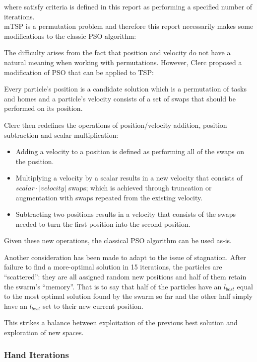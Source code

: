 \documentclass[a4paper]{article}
\begin{document}
where satisfy criteria is defined in this report as performing a specified number of iterations.\\

mTSP is a permutation problem and therefore this report necessarily makes some modifications to the classic PSO algorithm:

The difficulty arises from the fact that position and velocity do not have a natural meaning when working
with permutations. However, Clerc\cite{PermutationPSO} proposed a modification of PSO that can be applied to TSP:

Every particle's position is a candidate solution which is a permutation of tasks and homes and
a particle's velocity consists of a set of swaps that should be performed on its position.

Clerc then redefines the operations of position/velocity addition, position subtraction and scalar multiplication:
\begin{itemize}
\item Adding a velocity to a position is defined as performing all of the swaps on the position.
\item Multiplying a velocity by a scalar results in a new velocity that consists of $scalar\cdot |velocity|$ swaps; which is achieved through truncation or augmentation with swaps repeated from the existing velocity.
\item Subtracting two positions results in a velocity that consists of the swaps needed to turn the first position into the second position.
\end{itemize}
Given these new operations, the classical PSO algorithm can be used as-is.

Another consideration has been made to adapt to the issue of stagnation. After failure to find a more-optimal solution in 15 iterations, the particles are ``scattered'': they are all assigned random new positions and half of them retain the swarm's ``memory''. That is to say that half of the particles have an $l_\mathit{best}$ equal to the most optimal solution found by the swarm so far and the other half simply have an $l_\mathit{best}$ set to their new current position.

This strikes a balance between exploitation of the previous best solution and exploration of new spaces.

\subsubsection{Hand Iterations}
\end{document}
